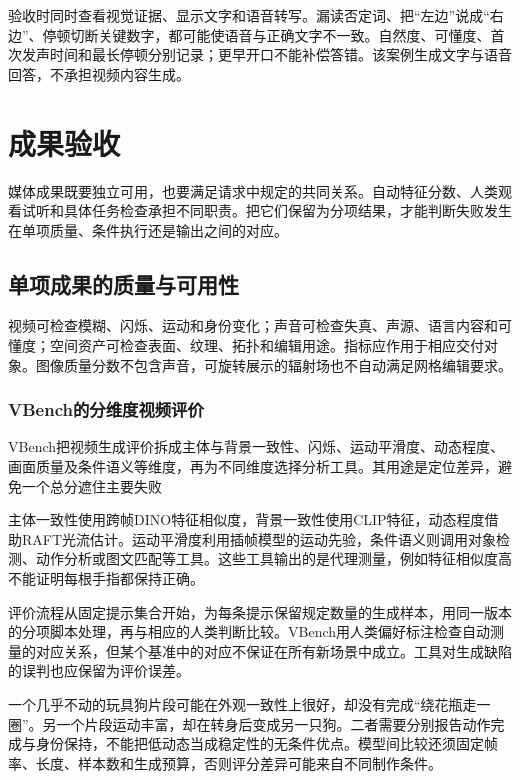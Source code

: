 验收时同时查看视觉证据、显示文字和语音转写。漏读否定词、把“左边”说成“右边”、停顿切断关键数字，都可能使语音与正确文字不一致。自然度、可懂度、首次发声时间和最长停顿分别记录；更早开口不能补偿答错。该案例生成文字与语音回答，不承担视频内容生成。

\section{成果验收}
\label{sec:vision-multigen-evaluation}

媒体成果既要独立可用，也要满足请求中规定的共同关系。自动特征分数、人类观看试听和具体任务检查承担不同职责。把它们保留为分项结果，才能判断失败发生在单项质量、条件执行还是输出之间的对应。

\subsection{单项成果的质量与可用性}
\label{sec:vision-multigen-quality}

视频可检查模糊、闪烁、运动和身份变化；声音可检查失真、声源、语言内容和可懂度；空间资产可检查表面、纹理、拓扑和编辑用途。指标应作用于相应交付对象。图像质量分数不包含声音，可旋转展示的辐射场也不自动满足网格编辑要求。

\subsubsection{VBench的分维度视频评价}
\label{sec:vision-multigen-vbench}

VBench把视频生成评价拆成主体与背景一致性、闪烁、运动平滑度、动态程度、画面质量及条件语义等维度，再为不同维度选择分析工具。其用途是定位差异，避免一个总分遮住主要失败

主体一致性使用跨帧DINO特征相似度，背景一致性使用CLIP特征，动态程度借助RAFT光流估计。运动平滑度利用插帧模型的运动先验，条件语义则调用对象检测、动作分析或图文匹配等工具。这些工具输出的是代理测量，例如特征相似度高不能证明每根手指都保持正确。

评价流程从固定提示集合开始，为每条提示保留规定数量的生成样本，用同一版本的分项脚本处理，再与相应的人类判断比较。VBench用人类偏好标注检查自动测量的对应关系，但某个基准中的对应不保证在所有新场景中成立。工具对生成缺陷的误判也应保留为评价误差。

一个几乎不动的玩具狗片段可能在外观一致性上很好，却没有完成“绕花瓶走一圈”。另一个片段运动丰富，却在转身后变成另一只狗。二者需要分别报告动作完成与身份保持，不能把低动态当成稳定性的无条件优点。模型间比较还须固定帧率、长度、样本数和生成预算，否则评分差异可能来自不同制作条件。

